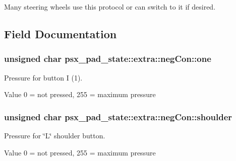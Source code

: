 Many steering wheels use this protocol or can switch to it if desired. 

\subsection{Field Documentation}
\hypertarget{structpsx__pad__state_1_1extra_1_1negCon_ab92a6ae63fc0da597e8c07ad393d6d44}{}
\subsubsection[{one}]{\setlength{\rightskip}{0pt plus 5cm}unsigned char psx\+\_\+pad\+\_\+state\+::extra\+::neg\+Con\+::one}\label{structpsx__pad__state_1_1extra_1_1negCon_ab92a6ae63fc0da597e8c07ad393d6d44}


Pressure for button I (1). 

\begin{DoxyParagraph}{Value }
0 = not pressed, 255 = maximum pressure 
\end{DoxyParagraph}
\hypertarget{structpsx__pad__state_1_1extra_1_1negCon_aaf8cb3aec1ced04942adaca02b55e7a4}{}
\subsubsection[{shoulder}]{\setlength{\rightskip}{0pt plus 5cm}unsigned char psx\+\_\+pad\+\_\+state\+::extra\+::neg\+Con\+::shoulder}\label{structpsx__pad__state_1_1extra_1_1negCon_aaf8cb3aec1ced04942adaca02b55e7a4}


Pressure for \char`\"{}\+L\char`\"{} shoulder button. 

\begin{DoxyParagraph}{Value }
0 = not pressed, 255 = maximum pressure 
\end{DoxyParagraph}
\hypertarget{structpsx__pad__state_1_1extra_1_1negCon_a2b80fffb7562cb5e49a27b39abf6d801}{}
